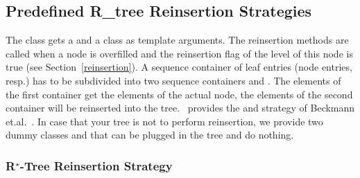 \subsection{Predefined R\_tree Reinsertion Strategies}
\label{Reinsertpre}
\label{Reinsertionpre}

The  class gets a  and a
  class as template
arguments. 
The reinsertion methods are called when a node is
overfilled and the reinsertion flag of the level of this node 
 is true (see Section~\ref{reinsertion}).
A sequence container of leaf  entries (node
entries, resp.) has to be subdivided into two sequence containers 
 and . The elements of the
first container get the elements of the actual node, the elements 
of the second container will be reinserted into the tree.
\cgal\  provides the 
 and   
strategy of Beckmann
et.al.~\cite{bkss-rtera-90}. 
In case that your tree is not to perform reinsertion, we provide
two dummy classes  and
 that can be plugged in the tree and do nothing.

\subsubsection{R$^\star$-Tree Reinsertion Strategy}

